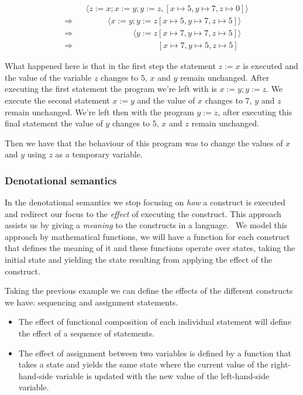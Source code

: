 \begin{equation*}
\begin{split}
& \phantom{\Rightarrow} \phantom{=} \langle z:=x; x:=y; y:=z, [x\mapsto5, y\mapsto7, z\mapsto0]\rangle\\
& \Rightarrow \phantom{=} \phantom{z:=x} \langle x:=y; y:=z [x\mapsto5, y\mapsto7, z\mapsto5]\rangle\\
& \Rightarrow \phantom{=} \phantom{z:=x; x:=y} \langle y:=z [x\mapsto7, y\mapsto7, z\mapsto5]\rangle\\
& \Rightarrow \phantom{=} \phantom{z:=x; x:=y; y:=z} [x\mapsto7, y\mapsto5, z\mapsto5]
\end{split}
\end{equation*}

What happened here is that in the first step the statement $z:=x$ is executed and the value of the variable $z$ changes to $5$, $x$ and $y$ remain unchanged.
After executing the first statement the program we're left with is $x:=y; y:=z$.
We execute the second statement $x:=y$ and the value of $x$ changes to $7$, $y$ and $z$ remain unchanged.
We're left then with the program $y:=z$, after executing this final statement the value of $y$ changes to $5$, $x$ and $z$ remain unchanged.

Then we have that the behaviour of this program was to change the values of $x$ and $y$ using $z$ as a temporary variable.


\subsubsection{Denotational semantics}
In the denotational semantics we stop focusing on \textit{how} a construct is executed and redirect our focus to the \textit{effect} of executing the construct.
This approach assists us by giving a \textit{meaning} to the constructs in a language.~\parencite{nipkow}
We model this approach by mathematical functions, we will have a function for each construct that defines the meaning of it and these functions operate over states, taking the initial state and yielding the state resulting from applying the effect of the construct.

Taking the previous example we can define the effects of the different constructs we have: sequencing and assignment statements.

\begin{itemize}
\item{The effect of functional composition of each individual statement will define the effect of a sequence of statements.}
\item{The effect of assignment between two variables is defined by a function that takes a state and yields the same state where the current value of the right-hand-side variable is updated with the new value of the left-hand-side variable.}
\end{itemize}

